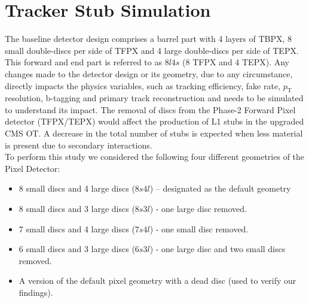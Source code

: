 \section{Tracker Stub Simulation}

The baseline detector design comprises a barrel part with 4 layers of TBPX, 8 small double-discs per side of TFPX and 4 large double-discs per side of TEPX. This forward and end part is referred to as $8l4s$ (8 TFPX and 4 TEPX). Any changes made to the detector design or its geometry, due to any circumstance, directly impacts the physics variables, such as tracking efficiency, fake rate, $p_\text{T}$ resolution, b-tagging and primary track reconstruction and needs to be simulated to understand its impact. The removal of discs from the Phase-2 Forward Pixel detector (TFPX/TEPX) would affect the production of L1 stubs in the upgraded CMS OT. A decrease in the total number of stubs is expected when less material is present due to secondary interactions.\\

To perform this study we considered the following four different geometries of the Pixel Detector:

\begin{itemize}
\item{8 small discs and 4 large discs ($8s4l$) -- designated as the default geometry}
\item{8 small discs and 3 large discs ($8s3l$) - one large disc removed.}
\item{7 small discs and 4 large discs ($7s4l$) -  one small disc removed.}
\item{6 small discs and 3 large discs ($6s3l$) - one large disc and two small discs removed.}
\item{A version of the default pixel geometry with a dead disc (used to verify our findings).}
\end{itemize}

\vspace{1em}

